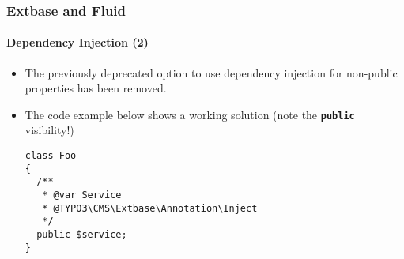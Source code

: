 %

\begin{frame}[fragile]
	\frametitle{Extbase and Fluid}
	\framesubtitle{Dependency Injection (2)}


	\begin{itemize}
		\item The previously deprecated option to use dependency injection
			for non-public properties has been removed.
		\item The code example below shows a working solution\newline
			\small(note the \texttt{\textbf{public}} visibility!)\normalsize
\begin{lstlisting}
class Foo
{
  /**
   * @var Service
   * @TYPO3\CMS\Extbase\Annotation\Inject
   */
  public $service;
}
\end{lstlisting}

	\end{itemize}

\end{frame}


